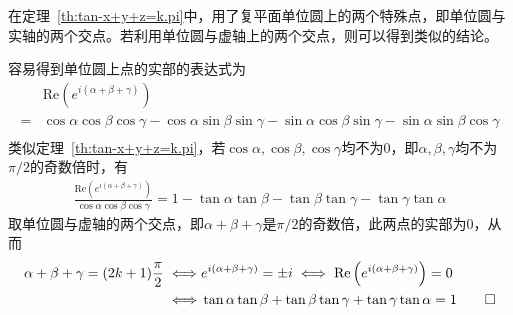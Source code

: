 \begin{example}
  在定理~\ref{th:tan-x+y+z=k.pi}中，用了复平面单位圆上的两个特殊点，即单位圆与实轴的两个交点。若利用单位圆与虚轴上的两个交点，则可以得到类似的结论。

  \begin{center}
  \end{center}
  容易得到单位圆上点的实部的表达式为
  \begin{align*}
        & \mathrm{Re}\left( e^{i(\alpha + \beta + \gamma)}\right) \\
    ={} & \cos\alpha\cos\beta\cos\gamma - \cos\alpha\sin\beta\sin\gamma
          - \sin\alpha\cos\beta\sin\gamma - \sin\alpha\sin\beta\cos\gamma\\
  \end{align*}
  类似定理~\ref{th:tan-x+y+z=k.pi}，若$\cos\alpha, \cos\beta, \cos\gamma$均不为0，即$\alpha, \beta, \gamma$均不为$\pi/2$的奇数倍时，有
  \begin{align*}
    \frac{\mathrm{Re}\left( e^{i(\alpha + \beta + \gamma)}\right)}{\cos\alpha\cos\beta\cos\gamma}
    ={} 1 - \tan\alpha\tan\beta - \tan\beta\tan\gamma - \tan\gamma\tan\alpha
  \end{align*}
  取单位圆与虚轴的两个交点，即$\alpha + \beta + \gamma$是$\pi/2$的奇数倍，此两点的实部为0，从而
  \begin{align*}
    \alpha + \beta + \gamma = (2k + 1)\frac\pi2
    \iff & e^{i(\alpha + \beta + \gamma)} = \pm i 
    \iff \mathrm{Re}\left(e^{i(\alpha + \beta + \gamma)}\right) = 0\\
    \iff & \tan\alpha\tan\beta + \tan\beta\tan\gamma + \tan\gamma\tan\alpha = 1\qedhere\\
  \end{align*}
\end{example}

